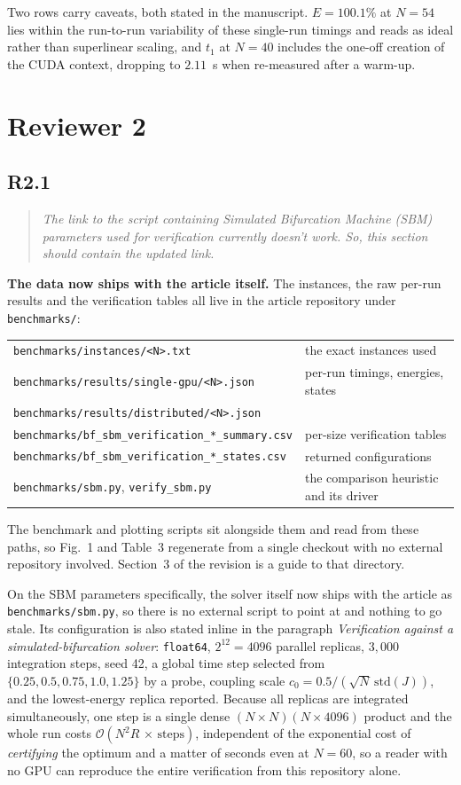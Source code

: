\documentclass[11pt,a4paper]{article}
\newenvironment{reviewercomment}
  {\begin{quote}\itshape\small}
  {\end{quote}}
\newcommand{\point}[2]{%
  \subsection*{#1}%
  \begin{reviewercomment}#2\end{reviewercomment}}
\begin{document}
Two rows carry caveats, both stated in the manuscript. $E=100.1\%$ at $N=54$ lies within the
run-to-run variability of these single-run timings and reads as ideal rather than superlinear
scaling, and $t_1$ at $N=40$ includes the one-off creation of the CUDA context, dropping to
$2.11$~s when re-measured after a warm-up.

\section*{Reviewer 2}

\point{R2.1}{The link to the script containing Simulated Bifurcation Machine (SBM) parameters
used for verification currently doesn't work. So, this section should contain the updated
link.}

\textbf{The data now ships with the article itself.} The
instances, the raw per-run results and the verification tables all live in the article
repository under \texttt{benchmarks/}:

\begin{center}
\small
\begin{tabular}{@{}ll@{}}
\texttt{benchmarks/instances/<N>.txt} & the exact instances used \\
\texttt{benchmarks/results/single-gpu/<N>.json} & per-run timings, energies, states \\
\texttt{benchmarks/results/distributed/<N>.json} & \\
\texttt{benchmarks/bf\_sbm\_verification\_*\_summary.csv} & per-size verification tables \\
\texttt{benchmarks/bf\_sbm\_verification\_*\_states.csv} & returned configurations \\
\texttt{benchmarks/sbm.py}, \texttt{verify\_sbm.py} & the comparison heuristic and its driver \\
\end{tabular}
\end{center}

The benchmark and plotting scripts sit alongside them and read from these paths, so Fig.~1 and
Table~3 regenerate from a single checkout with no external repository involved. Section~3 of
the revision is a guide to that directory.

On the SBM parameters specifically, the solver itself now ships with the article as
\texttt{benchmarks/sbm.py}, so there is no external script to point at and nothing to go
stale. Its configuration is also stated inline in the paragraph \emph{Verification against a
simulated-bifurcation solver}: \texttt{float64}, $2^{12}=4096$ parallel replicas, $3{,}000$
integration steps, seed 42, a global time step selected from $\{0.25,0.5,0.75,1.0,1.25\}$ by a
probe, coupling scale $c_0=0.5/(\sqrt{N}\,\mathrm{std}(J))$, and the lowest-energy replica
reported. Because all replicas are integrated simultaneously, one step is a single dense
$(N\!\times\!N)(N\!\times\!4096)$ product and the whole run costs
$\mathcal{O}(N^{2}R\,\times\,\mathrm{steps})$, independent of the exponential cost of
\emph{certifying} the optimum and a matter of seconds even at $N=60$, so a reader with no GPU
can reproduce the entire verification from this repository alone.
\end{document}
